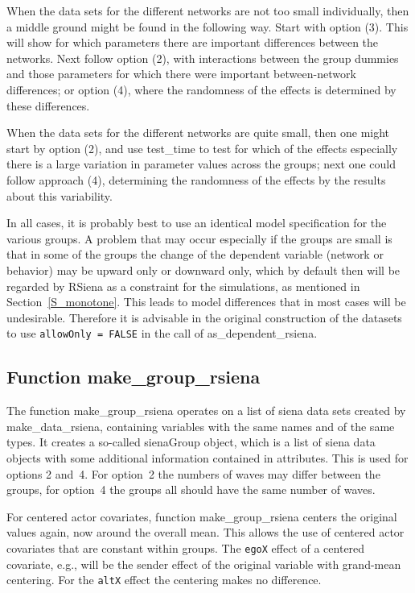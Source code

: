 \documentclass[a4paper,fleqn,11pt]{article}
\newcommand{\+}{\, + \,}
\newcommand{\sfn}[1]{\textsf{#1}}
\newcommand{\RS}{{\sf \textsf{RSiena} }}
\begin{document}
When the data sets for the different networks are not too small
individually,
then a middle ground might be found in the following way.
Start with option (3). This will show for which parameters there are
important differences between the networks.
Next follow option (2), with interactions between the group dummies
and those parameters for which there were important between-network
differences; or option (4), where the randomness of the effects
is determined by these differences.

When the data sets for the different networks are quite small,
then one might start by option (2), and use \textsf{test\_time} to test
for which of the effects especially there is a large variation in
parameter values across the groups;
next one could follow approach (4), determining the randomness of the effects
by the results about this variability.

In all cases, it is probably best to use an identical model specification
for the various groups. A problem that may occur especially if the groups
are small is that in some of the groups the change of the dependent variable
(network or behavior) may be upward only or downward only, which by default
then will be regarded by \RS as a constraint for the simulations,
as mentioned in Section~\ref{S_monotone}.
This leads to model differences that in most cases will be undesirable.
Therefore it is advisable in the original construction of the datasets
to use \texttt{allowOnly = FALSE} in the call of \textsf{as\_dependent\_rsiena}.

\subsection{Function \textsf{make\_group\_rsiena}  }
\label{S_multigroup}

The function \textsf{make\_group\_rsiena} operates on a list
of \sfn{siena} data sets created by \textsf{make\_data\_rsiena},
containing variables with the same names and of the same types.
It creates a so-called \sfn{sienaGroup} object, which is a list of
\sfn{siena} data objects with some additional information
contained in attributes.
This is used for options 2 and~4.
For option~2 the numbers of waves may differ between the groups,
for option~4 the groups all should have the same number of waves.

For centered actor covariates, function \textsf{make\_group\_rsiena}
centers the original values again, now around the overall mean.
This allows the use of centered actor covariates that are
constant within groups.
The \texttt{egoX} effect of a centered covariate,
e.g., will be the sender effect of the original variable
with grand-mean centering. For the \texttt{altX} effect the centering
makes no difference.
\end{document}
